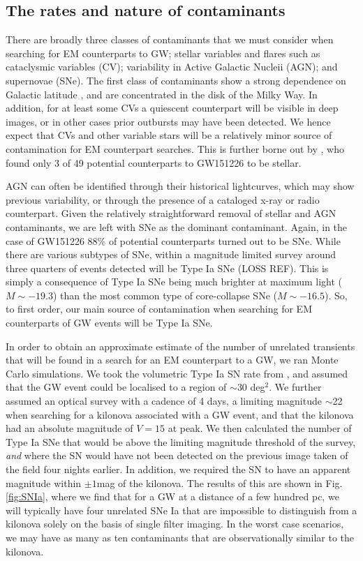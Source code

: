 \documentclass{aa}
\begin{document}
\subsection{The rates and nature of contaminants}

There are broadly three classes of contaminants that we must consider when searching for EM counterparts to GW; stellar variables and flares such as cataclysmic variables (CV); variability in Active Galactic Nucleii (AGN); and supernovae (SNe). The first class of contaminants show a strong dependence on Galactic latitude \citep{Drak14}, and are concentrated in the disk of the Milky Way. In addition, for at least some CVs a quiescent counterpart will be visible in deep images, or in other cases prior outbursts may have been detected. We hence expect that CVs and other variable stars will be a relatively minor source of contamination for EM counterpart searches. This is further borne out by \cite{Smar16}, who found only 3 of 49 potential counterparts to GW151226 to be stellar.

AGN can often be identified through their historical lightcurves, which may show previous variability, or through the presence of a cataloged x-ray or radio counterpart. Given the relatively straightforward removal of stellar and AGN contaminants, we are left with SNe as the dominant contaminant. Again, in the case of GW151226 88\% of potential counterparts turned out to be SNe. While there are various subtypes of SNe, within a magnitude limited survey around three quarters of events detected will be Type Ia SNe (LOSS REF). This is simply a consequence of Type Ia SNe being much brighter at maximum light ($M\sim -19.3$) than the most common type of core-collapse SNe ($M\sim -16.5$). So, to first order, our main source of contamination when searching for EM counterparts of GW events will be Type Ia SNe.

In order to obtain an approximate estimate of the number of unrelated transients that will be found in a search for an EM counterpart to a GW, we ran Monte Carlo simulations. We took the volumetric Type Ia SN rate from \cite{2010ApJ...713.1026D}, and assumed that the GW event could be localised to a region of $\sim$30 deg$^2$. We further assumed an optical survey with a cadence of 4 days, a limiting magnitude $\sim$22 when searching for a kilonova associated with a GW event, and that the kilonova had an absolute magnitude of $V=15$ at peak. We then calculated the number of Type Ia SNe that would be above the limiting magnitude threshold of the survey, {\it and} where the SN would have not been detected on the previous image taken of the field four nights earlier. In addition, we required the SN to have an apparent magnitude within $\pm1$mag of the kilonova. The results of this are shown in Fig. \ref{fig:SNIa}, where we find that for a GW at a distance of a few hundred pc, we will typically have four unrelated SNe Ia that are impossible to distinguish from a kilonova solely on the basis of single filter imaging. In the worst case scenarios, we may have as many as ten contaminants that are observationally similar to the kilonova.
\end{document}

